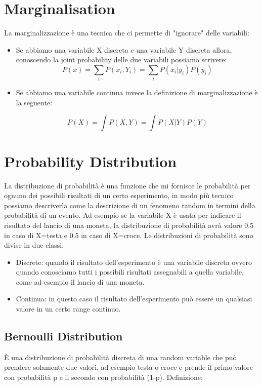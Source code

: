 \documentclass[14pt]{extreport}
\begin{document}
\section{Marginalisation}

La marginalizzazione è una tecnica che ci permette di "ignorare" delle variabili:

\begin{itemize}
\item Se abbiamo una variabile X discreta e una variabile Y discreta
allora, conoscendo la joint probability delle due variabili possiamo scrivere:
$$P(x) = \sum_i P(x_i, Y_i) = \sum_i P(x_i|y_i)P(y_i)$$

\item Se abbiamo una variabile continua invece la definizione di marginalizzazione è la seguente:

$$P(X) = \int P(X,Y) = \int P(X|Y)P(Y)$$

\end{itemize}

\section{Probability Distribution}

La distribuzione di probabilità è una funzione che mi fornisce le probabilità per ognuno dei possibili risultati di un certo esperimento, in modo più
tecnico possiamo descriverla come la descrizione di un fenomeno random in termini della probabilità di un evento. Ad esempio se la variabile X è usata
per indicare il risultato del lancio di una moneta, la distribuzione di probabilità avrà valore 0.5 in caso di X=testa e 0.5 in caso di X=croce. Le
distribuzioni di probabilità sono divise in due classi:
\begin{itemize}
\item Discrete: quando il risultato dell'esperimento è una variabile discreta ovvero quando conosciamo tutti i possibili risultati assegnabili a
quella variabile, come ad esempio il lancio di una moneta.
\item Continua: in questo caso il risultato dell'esperimento può essere un qualsiasi valore in un certo range continuo.
\end{itemize}

\subsection{Bernoulli Distribution}

È una distribuzione di probabilità discreta di una random variable che può prendere solamente due valori, ad esempio testa o croce e prende il primo
valore con probabilità p e il secondo con probabilità (1-p). Definizione:
\end{document}
